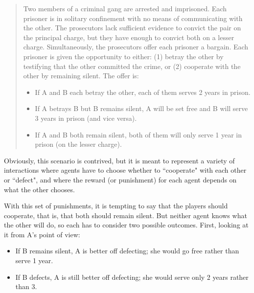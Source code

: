 \documentclass[12pt]{book}
\theoremstyle{exercise}
\begin{document}
\begin{quote}
Two members of a criminal gang are arrested and imprisoned. Each prisoner is in solitary confinement with no means of communicating with the other. The prosecutors lack sufficient evidence to convict the pair on the principal charge, but they have enough to convict both on a lesser charge. Simultaneously, the prosecutors offer each prisoner a bargain. Each prisoner is given the opportunity to either: (1) betray the other by testifying that the other committed the crime, or (2) cooperate with the other by remaining silent. The offer is:

\begin{itemize}

\item If A and B each betray the other, each of them serves 2 years in prison.

\item If A betrays B but B remains silent, A will be set free and B will serve 3 years in prison (and vice versa).

\item If A and B both remain silent, both of them will only serve 1 year in prison (on the lesser charge).

\end{itemize}

\end{quote}

Obviously, this scenario is contrived, but it is meant to represent a variety of interactions where agents have to choose whether to ``cooperate" with each other or ``defect", and where the reward (or punishment) for each agent depends on what the other chooses.


With this set of punishments, it is tempting to say that the players should cooperate, that is, that both should remain silent.  But neither agent knows what the other will do, so each has to consider two possible outcomes.  First, looking at it from A's point of view:

\begin{itemize}

\item If B remains silent, A is better off defecting; she would go free rather than serve 1 year.

\item If B defects, A is still better off defecting; she would serve only 2 years rather than 3.

\end{itemize}
\end{document}
